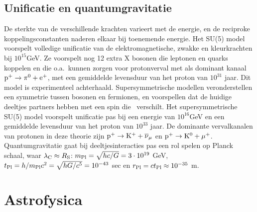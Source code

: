 \section[~~Unificatie en quantumgravitatie]{Unificatie en quantumgravitatie}
De sterkte van de verschillende krachten varieert met de energie, en de
reciproke koppelingsconstanten naderen elkaar bij toenemende energie. Het
SU(5) model voorspelt volledige unificatie van de elektromagnetische, zwakke
en kleurkrachten bij $10^{15}$GeV. Ze voorspelt nog 12 extra X bosonen die
leptonen en quarks koppelen en die o.a.\ kunnen zorgen voor protonverval met
als dominant kanaal ${\rm p}^+\rightarrow\pi^0+{\rm e}^+$, met een gemiddelde
levensduur van het proton van $10^{31}$ jaar. Dit model is experimenteel
achterhaald.
\npar
Supersymmetrische modellen veronderstellen een symmetrie tussen bosonen en
fermionen, en voorspellen dat de huidige deeltjes partners hebben met een
spin die \half\ verschilt. Het supersymmetrische SU(5) model voorspelt
unificatie pas bij een energie van $10^{16}$GeV en een gemiddelde levensduur
van het proton van $10^{33}$ jaar. De dominante vervalkanalen van protonen in
deze theorie zijn ${\rm p}^+\rightarrow{\rm K}^++\overline{\nu}_\mu$ en
${\rm p}^+\rightarrow{\rm K}^0+\mu^+$.
\npar
Quantumgravitatie gaat bij deeltjesinteracties pas een rol spelen op Planck
schaal, waar $\lambda_{\rm C}\approx R_{\rm S}$:
$m_{\rm Pl}=\sqrt{hc/G}=3\cdot10^{19}$ GeV,
$t_{\rm Pl}=h/m_{\rm Pl}c^2=\sqrt{hG/c^5}=10^{-43}$ sec en
$r_{\rm Pl}=ct_{\rm Pl}\approx 10^{-35}$ m.

\chapter{Astrofysica}
